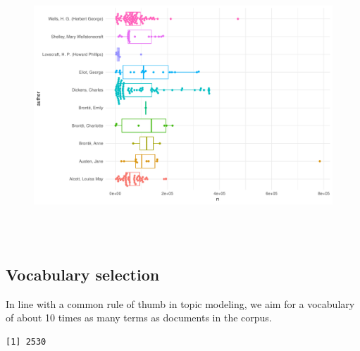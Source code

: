 \documentclass[
]{article}
\newenvironment{Shaded}{\begin{snugshade}}{\end{snugshade}}
\newcommand{\DecValTok}[1]{\textcolor[rgb]{0.68,0.00,0.00}{#1}}
\newcommand{\FunctionTok}[1]{\textcolor[rgb]{0.28,0.35,0.67}{#1}}
\newcommand{\NormalTok}[1]{\textcolor[rgb]{0.00,0.23,0.31}{#1}}
\newcommand{\OtherTok}[1]{\textcolor[rgb]{0.00,0.23,0.31}{#1}}
\newcommand{\SpecialCharTok}[1]{\textcolor[rgb]{0.37,0.37,0.37}{#1}}
\begin{document}
\begin{figure}[H]

{\centering \includegraphics[width=6in,height=4in]{paper_files/figure-pdf/unnamed-chunk-41-1.pdf}

}

\end{figure}

\hypertarget{vocabulary-selection}{%
\subsection{Vocabulary selection}\label{vocabulary-selection}}

In line with a common rule of thumb in topic modeling, we aim for a
vocabulary of about 10 times as many terms as documents in the corpus.

\begin{Shaded}
\end{Shaded}

\begin{verbatim}
[1] 2530
\end{verbatim}
\end{document}
